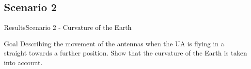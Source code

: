 \subsection{Scenario 2}

\begin{frame}{Results}{Scenario 2 - Curvature of the Earth}

  \begin{block}{Goal}
	Describing the movement of the antennas when the UA is flying in a straight towards a further position.
	Show that the curvature of the Earth is taken into account.
  \end{block}

  \begin{figure}[H]
    \centerline{
    \hfill
    }
  \end{figure}

\end{frame}



